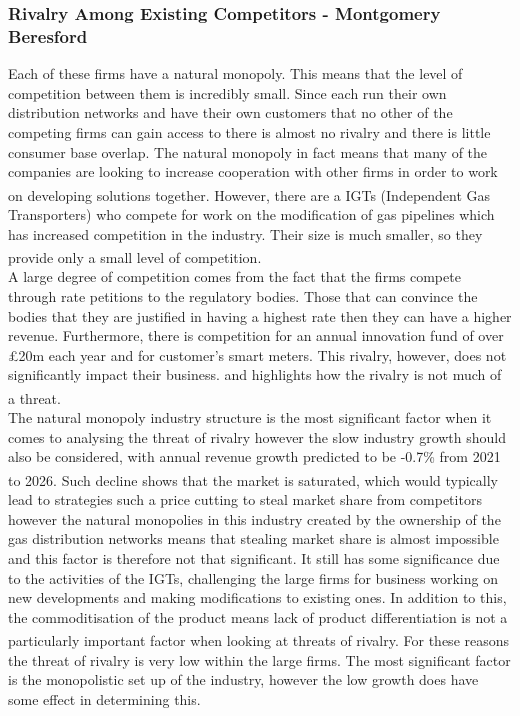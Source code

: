 \documentclass[11pt]{article}		%
\newcommand{\supercite}[1]{\textsuperscript{\cite{#1}}}		%
\begin{document}
        \subsubsection[Rivalry Among Existing Competitors]{Rivalry Among Existing Competitors - Montgomery Beresford}
                Each of these firms have a natural monopoly. This means that the level of competition between them is incredibly small. Since each run their own distribution networks and have their own customers that no other of the competing firms can gain access to there is almost no rivalry and there is little consumer base overlap. The natural monopoly in fact means that many of the companies are looking to increase cooperation with other firms in order to work on developing solutions together.\supercite{SGN-GD2} 
                However, there are a IGTs (Independent Gas Transporters) who compete for work on the modification of gas pipelines which has increased competition in the industry. Their size is much smaller, so they provide only a small level of competition.\supercite{Gas_Distribution_Industry} 
                \\
                A large degree of competition comes from the fact that the firms compete through rate petitions to the regulatory bodies. Those that can convince the bodies that they are justified in having a highest rate then they can have a higher revenue. Furthermore, there is competition for an annual innovation fund of over £20m each year and for customer’s smart meters. This rivalry, however, does not significantly impact their business. and highlights how the rivalry is not much of a threat.\supercite{Gas_Distribution_Industry}
                \\
                The natural monopoly industry structure is the most significant factor when it comes to analysing the threat of rivalry however the slow industry growth should also be considered, with annual revenue growth predicted to be -0.7\% from 2021 to 2026.\supercite{Gas_Distribution_Industry} Such decline shows that the market is saturated, which would typically lead to strategies such a price cutting to steal market share from competitors however the natural monopolies in this industry created by the ownership of the gas distribution networks means that stealing market share is almost impossible and this factor is therefore not that significant. It still has some significance due to the activities of the IGTs, challenging the large firms for business working on new developments and making modifications to existing ones. 
                In addition to this, the commoditisation of the product means lack of product differentiation is not a particularly important factor when looking at threats of rivalry.\supercite{Gas_Distribution_Industry}
                For these reasons the threat of rivalry is very low within the large firms. The most significant factor is the monopolistic set up of the industry, however the low growth does have some effect in determining this.
\end{document}

